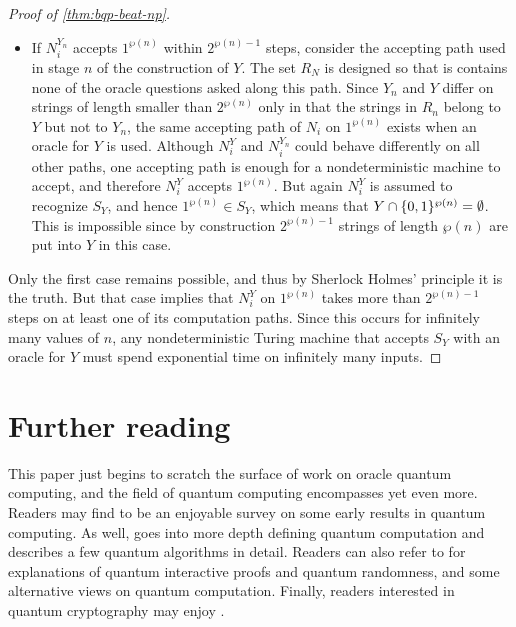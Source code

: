 \documentclass[12pt]{article}
\begin{document}
\begin{mdframed}
\begin{proof}[Proof of \cref{thm:bqp-beat-np}]
\begin{itemize}
      which means that $Y \cap \zo^{\wp(n)} \ne \emptyset$. This is impossible
      since by construction no strings of length $\wp(n)$ are put into $Y$ in
      this case.
    \item If $N_i^{Y_n}$ accepts $1^{\wp(n)}$ within $2^{\wp(n)-1}$ steps,
      consider the accepting path used in stage $n$ of the construction of $Y$.
      The set $R_N$ is designed so that is contains none of the oracle questions
      asked along this path. Since $Y_n$ and $Y$ differ on strings of length
      smaller than $2^{\wp(n)}$ only in that the strings in $R_n$ belong to $Y$
      but not to $Y_n$, the same accepting path of $N_i$ on $1^{\wp(n)}$ exists
      when an oracle for $Y$ is used. Although $N_i^Y$ and $N_i^{Y_n}$ could
      behave differently on all other paths, one accepting path is enough for a
      nondeterministic machine to accept, and therefore $N_i^Y$ accepts
      $1^{\wp(n)}$. But again $N_i^Y$ is assumed to recognize $S_Y$, and hence
      $1^{\wp(n)} \in S_Y$, which means that $Y \cap \{0,1\}^{\wp(n)} = \emptyset$.
      This is impossible since by construction $2^{\wp(n)-1}$ strings of length
      $\wp(n)$ are put into $Y$ in this case.
  \end{itemize}
  Only the first case remains possible, and thus by Sherlock Holmes' principle
  it is the truth. But that case implies that $N_i^Y$ on $1^{\wp(n)}$ takes more
  than $2^{\wp(n)-1}$ steps on at least one of its computation paths. Since this
  occurs for infinitely many values of $n$, any nondeterministic Turing machine
  that accepts $S_Y$ with an oracle for $Y$ must spend exponential time on
  infinitely many inputs.
\end{proof}
\end{mdframed}


\section{Further reading}
This paper just begins to scratch the surface of work on oracle quantum
computing, and the field of quantum computing encompasses yet even more. Readers
may find \cite{BB92b} to be an enjoyable survey on some early results in quantum
computing. As well, \cite{AB09} goes into more depth defining quantum
computation and describes a few quantum algorithms in detail. Readers can also
refer to \cite{Wig19} for explanations of quantum interactive proofs and quantum
randomness, and some alternative views on quantum computation. Finally, readers
interested in quantum cryptography may enjoy \cite{BEM+07}.


\nocite{*}


\end{document}
